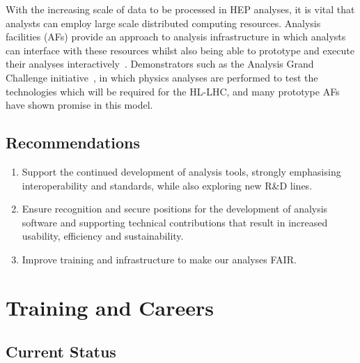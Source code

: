 \documentclass[10pt,a4paper]{article}
\begin{document}
With the increasing scale of data to be processed in HEP analyses, it is
vital that analysts can employ large scale distributed computing resources.
Analysis facilities (AFs) provide an approach to analysis infrastructure in
which analysts can interface with these resources whilst also being able to
prototype and execute their analyses interactively~\cite{WLCG:ana_fac_wp}. Demonstrators
such as the Analysis Grand Challenge
initiative~\cite{Held:2022RC}, in which physics analyses
are performed to test the technologies which will be required for the HL-LHC,
and many prototype AFs have shown promise in this model.

\subsection{Recommendations}\label{recommendations-3}

\begin{enumerate}
\def\labelenumi{\arabic{enumi}.}
\item
  Support the continued development of analysis tools, strongly
  emphasising interoperability and standards, while also exploring new
  R\&D lines.
\item
  Ensure recognition and secure positions for the development of
  analysis software and supporting technical contributions that
  result in increased usability, efficiency and sustainability.
\item
  Improve training and infrastructure to make our analyses FAIR.
\end{enumerate}

\section{Training and Careers}\label{training-and-careers}

\subsection{Current Status}\label{current-status}
\end{document}

